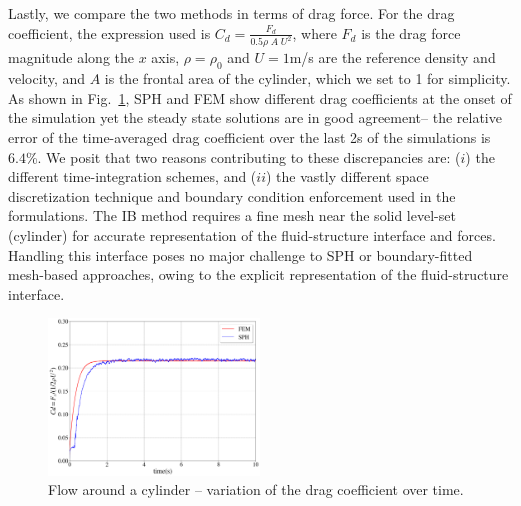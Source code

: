 \documentclass[final,3p,times]{elsarticle}
\begin{document}
Lastly, we compare the two methods in terms of drag force. For the drag coefficient, the expression used is $C_d=\frac{F_d}{0.5\rho\;A\; U^2}$, where $F_d$ is the drag force magnitude along the $x$ axis, $\rho=\rho_0$ and $U=1$\si{m/s} are the reference density and velocity, and $A$ is the frontal area of the cylinder, which we set to 1 for simplicity.  As shown in Fig.~\ref{fig:FoC}, SPH and FEM show different drag coefficients at the onset of the simulation yet the steady state solutions are in good agreement-- the relative error of the time-averaged drag coefficient over the last 2\si{s} of the simulations is $6.4$\%. We posit that two reasons contributing to these discrepancies are: ($i$) the different time-integration schemes, and ($ii$) the vastly different space discretization technique and boundary condition enforcement used in the formulations. The IB method requires a fine mesh near the solid level-set (cylinder) for accurate representation of the fluid-structure interface and forces. Handling this interface poses no major challenge to SPH or boundary-fitted mesh-based approaches, owing to the explicit representation of the fluid-structure interface.

\begin{figure}[H]
	\begin{center}
        \vspace{-10pt}
		\includegraphics[width=0.5\textwidth]{Images/Figure_flow_around_cylinder.png}
	\end{center}
	\caption{Flow around a cylinder -- variation of the drag coefficient over time.}
	\label{fig:FoC}
\end{figure}
\end{document}
